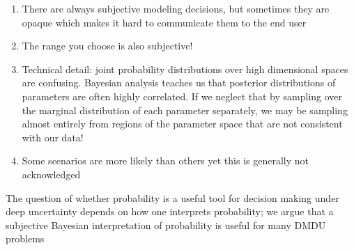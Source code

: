 \documentclass[11pt]{article}
\begin{document}
\begin{enumerate}
    \item There are always subjective  modeling decisions, but sometimes they are opaque which makes it hard to communicate them to the end user
    \item The range you choose is also subjective! \citep{schneider_dangerous:2001,schneider_scenarios:2002}
    \item Technical detail: joint probability distributions over high dimensional spaces are confusing. Bayesian analysis teaches us that posterior distributions of parameters are often highly correlated. If we neglect that by sampling over the marginal distribution of each parameter separately, we may be sampling almost entirely from regions of the parameter space that are not consistent with our data!
    \item Some scenarios are more likely than others \citep{hausfather_scenarios:2020,ho_scenarios:2019} yet this is generally not acknowledged
\end{enumerate}
The question of whether probability is a useful tool for decision making under deep uncertainty depends on how one interprets probability; we argue that a subjective Bayesian interpretation of probability is useful for many DMDU problems
\end{document}
